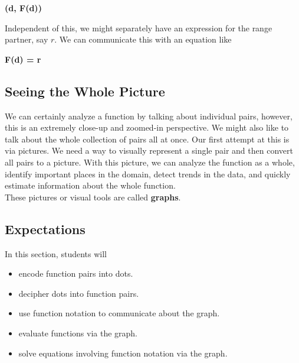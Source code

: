 \documentclass{ximera}
\begin{document}
\begin{center}
\textbf{\textcolor{purple!85!blue}{(d, F(d))}}
\end{center}




Independent of this, we might separately have an expression for the range partner, say $r$.  We can communicate this with an equation like




\begin{center}
\textbf{\textcolor{purple!85!blue}{F(d) = r}}
\end{center}


\subsection{Seeing the Whole Picture}

We can certainly analyze a function by talking about individual pairs, however, this is an extremely close-up and zoomed-in perspective. We might also like to talk about the whole collection of pairs all at once.  Our first attempt at this is via pictures. We need a way to visually represent a single pair and then convert all pairs to a picture.  With this picture, we can analyze the function as a whole, identify important places in the domain, detect trends in the data, and quickly estimate information about the whole function. \\

These pictures or visual tools are called \textbf{graphs}. \\






\subsection{Expectations}

\begin{sectionOutcomes}
In this section, students will 

\begin{itemize}
\item encode function pairs into dots.
\item decipher dots into function pairs.
\item use function notation to communicate about the graph.
\item evaluate functions via the graph.
\item solve equations involving function notation via the graph.
\end{itemize}
\end{sectionOutcomes}
\end{document}
